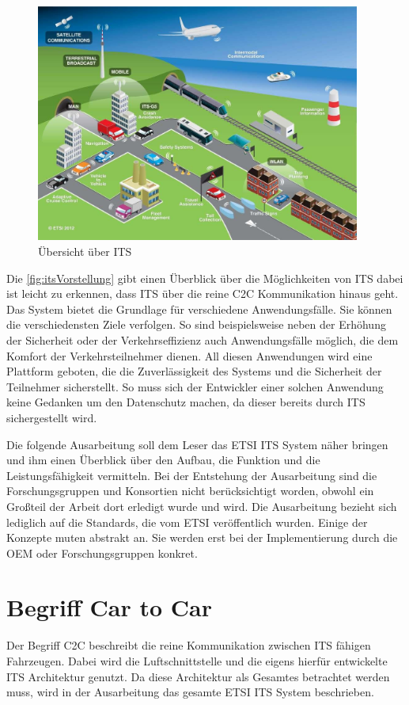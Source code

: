 \begin{figure}[h]
	\includegraphics[width=0.95\textwidth]{content/images/00_einleitung/ETSI_ITS_09_2012.jpg}
	\caption{Übersicht über ITS \cite{ITS_vorstellung}}
	\label{fig:itsVorstellung}
\end{figure}

Die \autoref{fig:itsVorstellung} gibt einen Überblick über die Möglichkeiten von \ac{ITS} dabei ist leicht zu erkennen, dass \ac{ITS} über die reine \ac{C2C} Kommunikation hinaus geht. Das System bietet die Grundlage für verschiedene Anwendungsfälle. Sie können die verschiedensten Ziele verfolgen. So sind beispielsweise neben der Erhöhung der Sicherheit oder der Verkehrseffizienz auch Anwendungsfälle möglich, die dem Komfort der Verkehrsteilnehmer dienen. All diesen Anwendungen wird eine Plattform geboten, die die Zuverlässigkeit des Systems und die Sicherheit der Teilnehmer sicherstellt. So muss sich der Entwickler einer solchen Anwendung keine Gedanken um den Datenschutz machen, da dieser bereits durch \ac{ITS} sichergestellt wird.

Die folgende Ausarbeitung soll dem Leser das \ac{ETSI} \ac{ITS} System näher bringen und ihm einen Überblick über den Aufbau, die Funktion und die Leistungsfähigkeit vermitteln. Bei der Entstehung der Ausarbeitung sind die Forschungsgruppen und Konsortien nicht berücksichtigt worden, obwohl ein Großteil der Arbeit dort erledigt wurde und wird. Die Ausarbeitung bezieht sich lediglich auf die Standards, die vom \ac{ETSI} veröffentlich wurden. Einige der Konzepte muten abstrakt an. Sie werden erst bei der Implementierung durch die \ac{OEM} oder Forschungsgruppen konkret.

\section{Begriff Car to Car}
Der Begriff \ac{C2C} beschreibt die reine Kommunikation zwischen \ac{ITS} fähigen Fahrzeugen. Dabei wird die Luftschnittstelle und die eigens hierfür entwickelte \ac{ITS} Architektur genutzt. Da diese Architektur als Gesamtes betrachtet werden muss, wird in der Ausarbeitung das gesamte \ac{ETSI} \ac{ITS} System beschrieben.  



